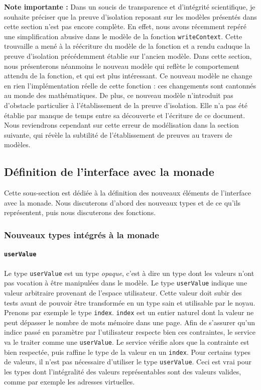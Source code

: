 		\textbf{Note importante :} Dans un soucis de transparence et d'intégrité scientifique, je souhaite préciser que la preuve d'isolation reposant sur les modèles présentés dans cette section n'est pas encore complète. En effet, nous avons récemment repéré une simplification abusive dans le modèle de la fonction \texttt{writeContext}. Cette trouvaille a mené à la réécriture du modèle de la fonction et a rendu caduque la preuve d'isolation précédemment établie sur l'ancien modèle. Dans cette section, nous présenterons néanmoins le nouveau modèle qui reflète le comportement attendu de la fonction, et qui est plus intéressant. Ce nouveau modèle ne change en rien l'implémentation réelle de cette fonction : ces changements sont cantonnés au monde des mathématiques. De plus, ce nouveau modèle n'introduit pas d'obstacle particulier à l'établissement de la preuve d'isolation. Elle n'a pas été établie par manque de temps entre sa découverte et l'écriture de ce document. Nous reviendrons cependant sur cette erreur de modélisation dans la section suivante, qui révèle la subtilité de l'établissement de preuves au travers de modèles.

		\subsection{Définition de l'interface avec la monade}

		Cette sous-section est dédiée à la définition des nouveaux éléments de l'interface avec la monade. Nous discuterons d'abord des nouveaux types et de ce qu'ils représentent, puis nous discuterons des fonctions.

		\subsubsection{Nouveaux types intégrés à la monade}

		\paragraph{\texttt{userValue}} Le type \texttt{userValue} est un type \emph{opaque}, c'est à dire un type dont les valeurs n'ont pas vocation à être manipulées dans le modèle. Le type \texttt{userValue} indique une valeur arbitraire provenant de l'espace utilisateur. Cette valeur doit subir des tests avant de pouvoir être transformée en un type sain et utilisable par le noyau. Prenons par exemple le type \texttt{index}. \texttt{index} est un entier naturel dont la valeur ne peut dépasser le nombre de mots mémoire dans une page. Afin de s'assurer qu'un indice passé en paramètre par l'utilisateur respecte bien ces contraintes, le service va le traiter comme une \texttt{userValue}. Le service vérifie alors que la contrainte est bien respectée, puis raffine le type de la valeur en un \texttt{index}. Pour certains types de valeurs, il n'est pas nécessaire d'utiliser le type \texttt{userValue}. Ceci est vrai pour les types dont l'intégralité des valeurs représentables sont des valeurs valides, comme par exemple les adresses virtuelles.

